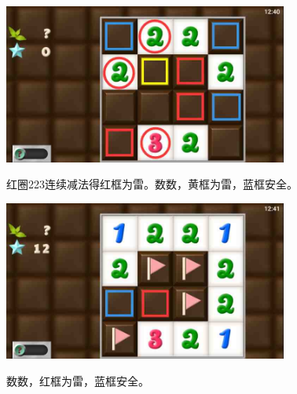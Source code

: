 \subsection{} %
\begin{center}
    \includegraphics[width=0.7\textwidth]{puzzlelow/132-1.jpg}
\end{center}
红圈223连续减法得红框为雷。数数，黄框为雷，蓝框安全。
\begin{center}
    \includegraphics[width=0.7\textwidth]{puzzlelow/132-2.jpg}
\end{center}
数数，红框为雷，蓝框安全。

